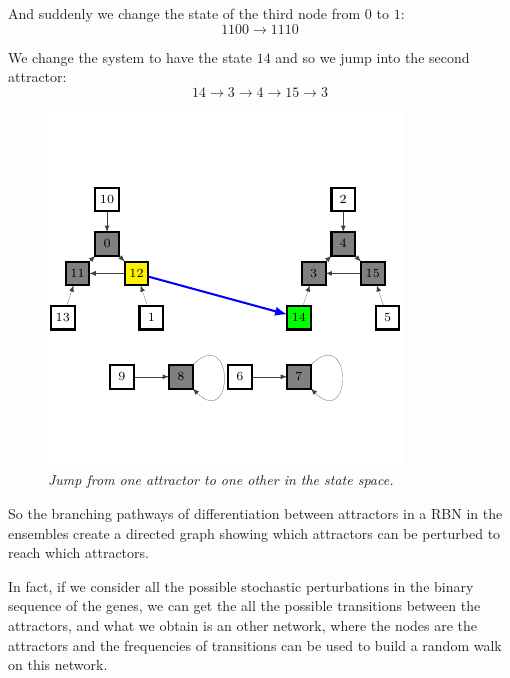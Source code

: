 And suddenly we change the state of the third node from $0$ to $1$:
$$
1100 \to 1110
$$

We change the system to have the state $14$ and so we jump into the second attractor:
$$
14 \to 3 \to 4 \to 15 \to 3
$$
\begin{figure}[h]
\centering
\includegraphics[scale=0.8]{fg4.pdf}
\caption{\emph{Jump from one attractor to one other in the state space.}}
\label{fig:rb4}
\end{figure}

So the branching pathways of differentiation between
attractors in a RBN in the ensembles create a directed
graph showing which attractors can be perturbed to
reach which attractors.

In fact, if we consider all the possible stochastic perturbations in the binary sequence of the genes, we can get the all the possible transitions between the attractors, and what we obtain is an other network, where the nodes are the attractors and the frequencies of transitions can be used to build a random walk on this network\cite{K2}.


